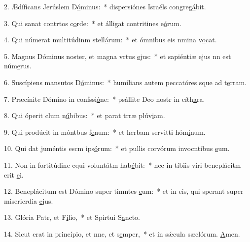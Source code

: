 2. Ædíficans Jerúslem D\uline{ó}minus:~* dispersiónes Israéls congreg\uline{á}bit.\par 
3. Qui sanat contrtos c\uline{o}rde:~* et álligat contritines e\uline{ó}rum.\par 
4. Qui númerat multitúdinm stell\uline{á}rum:~* et ómnibus eis nmina v\uline{o}cat.\par 
5. Magnus Dóminus noster, et magna vrtus \uline{e}jus:~* et sapiéntiæ ejus nn est núm\uline{e}rus.\par 
6. Suscípiens mansutos D\uline{ó}minus:~* humílians autem peccatóres sque ad t\uline{e}rram.\par 
7. Præcínite Dómino in confssi\uline{ó}ne:~* psállite Deo nostr in cíth\uline{a}ra.\par 
8. Qui óperit clum n\uline{ú}bibus:~* et parat trræ plúv\uline{i}am.\par 
9. Qui prodúcit in móntbus f\uline{e}num:~* et herbam servitti hóm\uline{i}num.\par 
10. Qui dat juméntis escm ips\uline{ó}rum:~* et pullis corvórum invocntibus \uline{e}um.\par 
11. Non in fortitúdine equi voluntátm hab\uline{é}bit:~* nec in tíbiis viri beneplácitm erit \uline{e}i.\par 
12. Beneplácitum est Dómino super timntes \uline{e}um:~* et in eis, qui sperant super misericrdia \uline{e}jus.\par 
13. Glória Patr, et F\uline{í}lio,~* et Spirtui S\uline{a}ncto.\par 
14. Sicut erat in princípio, et nnc, et s\uline{e}mper,~* et in sǽcula sæclórum. \uline{A}men.\par 
